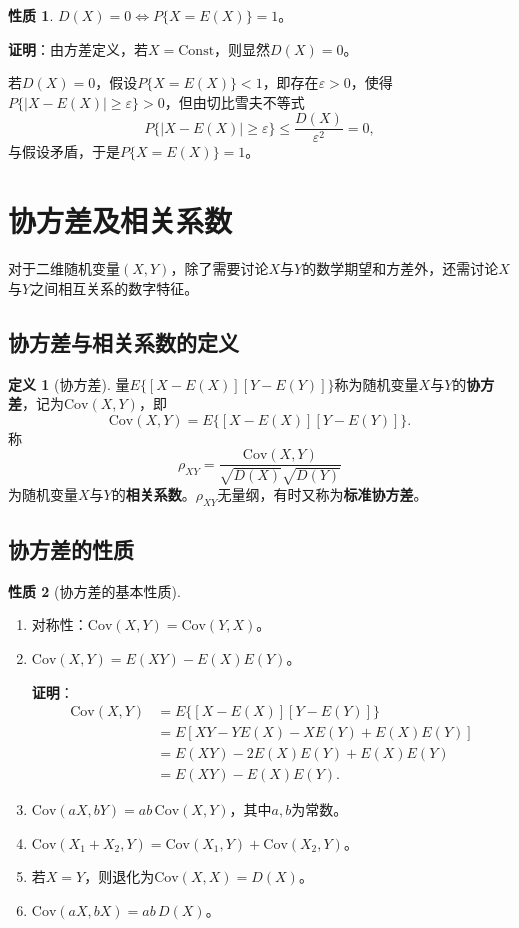 \documentclass[11pt,a4paper]{report}
\theoremstyle{definition}
\newtheorem{definition}{定义}[chapter]
\newtheorem{property}{性质}[chapter]
\begin{document}
\begin{property}
$D(X)=0\Leftrightarrow P\{X=E(X)\}=1$。
\end{property}

\textbf{证明}：由方差定义，若$X=\text{Const}$，则显然$D(X)=0$。

若$D(X)=0$，假设$P\{X=E(X)\}<1$，即存在$\varepsilon>0$，使得$P\{|X-E(X)|\geq\varepsilon\}>0$，但由切比雪夫不等式
\[
P\{|X-E(X)|\geq\varepsilon\}\leq\frac{D(X)}{\varepsilon^{2}}=0,
\]
与假设矛盾，于是$P\{X=E(X)\}=1$。

\section{协方差及相关系数}

对于二维随机变量$(X,Y)$，除了需要讨论$X$与$Y$的数学期望和方差外，还需讨论$X$与$Y$之间相互关系的数字特征。

\subsection{协方差与相关系数的定义}

\begin{definition}[协方差]
量$E\{[X-E(X)][Y-E(Y)]\}$称为随机变量$X$与$Y$的\textbf{协方差}，记为$\mathrm{Cov}(X,Y)$，即
\[
\mathrm{Cov}(X,Y)=E\{[X-E(X)][Y-E(Y)]\}.
\]
称
\[
\rho_{XY}=\frac{\mathrm{Cov}(X,Y)}{\sqrt{D(X)}\sqrt{D(Y)}}
\]
为随机变量$X$与$Y$的\textbf{相关系数}。$\rho_{XY}$无量纲，有时又称为\textbf{标准协方差}。
\end{definition}

\subsection{协方差的性质}

\begin{property}[协方差的基本性质]
\begin{enumerate}[label=\arabic*.,leftmargin=2em]
    \item 对称性：$\mathrm{Cov}(X,Y)=\mathrm{Cov}(Y,X)$。
    \item $\mathrm{Cov}(X,Y)=E(XY)-E(X)E(Y)$。
    
    \textbf{证明}：
    \begin{align*}
    \mathrm{Cov}(X,Y)&=E\{[X-E(X)][Y-E(Y)]\}\\
    &=E[XY-YE(X)-XE(Y)+E(X)E(Y)]\\
    &=E(XY)-2E(X)E(Y)+E(X)E(Y)\\
    &=E(XY)-E(X)E(Y).
    \end{align*}
    
    \item $\mathrm{Cov}(aX,bY)=ab\,\mathrm{Cov}(X,Y)$，其中$a,b$为常数。
    \item $\mathrm{Cov}(X_{1}+X_{2},Y)=\mathrm{Cov}(X_{1},Y)+\mathrm{Cov}(X_{2},Y)$。
    \item 若$X=Y$，则退化为$\mathrm{Cov}(X,X)=D(X)$。
    \item $\mathrm{Cov}(aX,bX)=ab\,D(X)$。
\end{enumerate}
\end{property}
\end{document}
